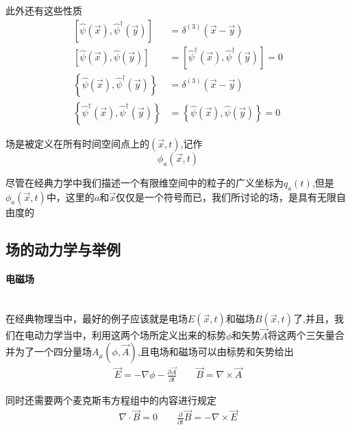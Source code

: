 \documentclass{article}
\begin{document}
此外还有这些性质
\begin{align*}
    \left[\hat{\psi}(\vec{x}) , \hat{\psi}^\dagger(\vec{y})\right] &= \delta^{(3)} \left(\vec{x} - \vec{y}\right) \\
    \left[\hat{\psi}(\vec{x}) , \hat{\psi}(\vec{y})\right]&= \left[\hat{\psi}^\dagger(\vec{x}) , \hat{\psi}^\dagger(\vec{y})\right] = 0 \\
    \left\{\hat{\psi}(\vec{x}) , \hat{\psi}^\dagger(\vec{y})\right\} &= \delta^{(3)} \left(\vec{x} - \vec{y}\right) \\
    \left\{\hat{\psi}^\dagger(\vec{x}) , \hat{\psi}^\dagger(\vec{y})\right\} &= \left\{\hat{\psi}(\vec{x}) , \hat{\psi}(\vec{y})\right\} = 0
\end{align*}




场是被定义在所有时间空间点上的$(\vec{x},t)$,记作$$\phi_a(\vec{x},t)$$


尽管在经典力学中我们描述一个有限维空间中的粒子的广义坐标为$q_a(t)$,但是$\phi_a(\vec{x},t)$中，这里的$a$和$\vec{x}$仅仅是一个符号而已，我们所讨论的场，是具有无限自由度的









\subsection{场的动力学与举例}

\paragraph{电磁场}\ \\
在经典物理当中，最好的例子应该就是电场$E(\vec{x},t)$和磁场$B(\vec{x},t)$了,并且，我们在电动力学当中，利用这两个场所定义出来的标势$\phi$和矢势$\vec{A}$将这两个三矢量合并为了一个四分量场$A_\mu(\phi,\vec{A})$,且电场和磁场可以由标势和矢势给出
\begin{align*}
    \vec{E}=-\nabla\phi-\frac{\partial\vec{A}}{\partial t}\quad\quad\vec{B}=\nabla\times\vec{A}
\end{align*}

同时还需要两个麦克斯韦方程组中的内容进行规定
\begin{align*}
    \nabla\cdot\vec{B}=0\quad\quad\frac{\partial}{\partial t}\vec{B}=-\nabla\times\vec{E}
\end{align*}
\end{document}

